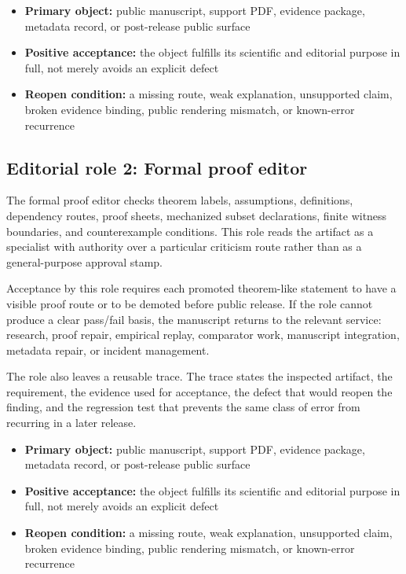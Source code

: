 \begin{itemize}[leftmargin=1.8em]

\item \textbf{Primary object:} public manuscript, support PDF, evidence package, metadata record, or post-release public surface

\item \textbf{Positive acceptance:} the object fulfills its scientific and editorial purpose in full, not merely avoids an explicit defect

\item \textbf{Reopen condition:} a missing route, weak explanation, unsupported claim, broken evidence binding, public rendering mismatch, or known-error recurrence

\end{itemize}

\subsection{Editorial role 2: Formal proof editor}

The formal proof editor checks theorem labels, assumptions, definitions, dependency routes, proof sheets, mechanized subset declarations, finite witness boundaries, and counterexample conditions. This role reads the artifact as a specialist with authority over a particular criticism route rather than as a general-purpose approval stamp.


Acceptance by this role requires each promoted theorem-like statement to have a visible proof route or to be demoted before public release. If the role cannot produce a clear pass/fail basis, the manuscript returns to the relevant service: research, proof repair, empirical replay, comparator work, manuscript integration, metadata repair, or incident management.


The role also leaves a reusable trace. The trace states the inspected artifact, the requirement, the evidence used for acceptance, the defect that would reopen the finding, and the regression test that prevents the same class of error from recurring in a later release.


\begin{itemize}[leftmargin=1.8em]

\item \textbf{Primary object:} public manuscript, support PDF, evidence package, metadata record, or post-release public surface

\item \textbf{Positive acceptance:} the object fulfills its scientific and editorial purpose in full, not merely avoids an explicit defect

\item \textbf{Reopen condition:} a missing route, weak explanation, unsupported claim, broken evidence binding, public rendering mismatch, or known-error recurrence

\end{itemize}


